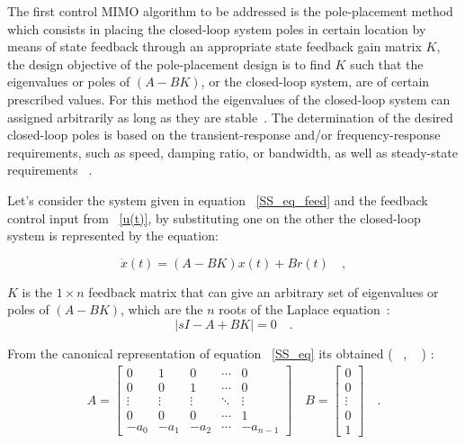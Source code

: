 The first control MIMO algorithm to be addressed  is the pole-placement method which consists in placing the closed-loop system poles in certain location by means of state feedback through an appropriate state feedback gain matrix $K$, the design objective of the pole-placement design is to find  $K$ such that the eigenvalues or poles of $(A-BK)$, or the closed-loop system, are of certain prescribed values. For this method the eigenvalues of the closed-loop system can assigned arbitrarily  as long as they are stable~\cite[Chapter~10]{Golnaraghi2010}. The  determination of the desired closed-loop poles is based on the transient-response and/or frequency-response requirements, such as speed, damping ratio, or bandwidth, as well as steady-state requirements ~\cite[Chapter~10]{Ogata2009}.
\smallskip

Let's consider the system given in equation ~\ref{SS_eq_feed} and the feedback control input from ~\ref{u(t)}, by substituting one on the other the closed-loop system is represented by the equation:

\begin{equation}
	\dot{x}(t)=(A-BK)x(t) + Br(t)	\quad ,
\end{equation}

 $K$ is the $1\times n$ feedback matrix that can give an arbitrary set of eigenvalues or poles of $(A-BK)$, which are the $n$ roots of the Laplace equation~\cite[Chapter~10]{Golnaraghi2010}:
\begin{equation}
	|sI-A+BK|=0 \quad.
\end{equation}

 From the canonical representation of equation ~\ref{SS_eq} its obtained (~\cite[Chapter~10]{Golnaraghi2010} , ~\cite[Chapter~4]{Chen1999} ) :
 \begin{align}
 A=\begin{bmatrix}
 0& 1& 0 & \cdots & 0\\
 0 & 0 & 1 & \cdots & 0\\
 \vdots & \vdots & \vdots &\ddots & \vdots \\
 0 & 0 & 0 & \cdots & 1 \\
 -a_0 & -a_1 & -a_2 & \cdots & -a_{n-1}
 \end{bmatrix} \quad
 B=\begin{bmatrix}
 0 \\ 0 \\ \vdots \\ 0 \\ 1
 \end{bmatrix} \quad .
 \end{align}

